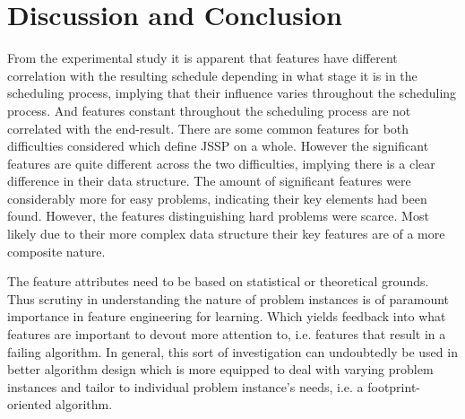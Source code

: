 \documentclass[10pt]{llncs} %
\newcommand{\bad}{\emph{bad} }
\begin{document}
\section{Discussion and Conclusion}\label{sec:Discussion}

From the experimental study it is apparent that features have different %
correlation with the resulting schedule depending in what stage it is in the scheduling process, implying that their influence varies throughout the scheduling process. And features constant throughout the scheduling process are not correlated with the end-result.
There are some common features for both difficulties considered which define JSSP on a whole. However the significant features are quite different across the two difficulties, implying there is a clear difference in their data structure. The amount of significant features were considerably more for easy problems, indicating their key elements had been found. However, the features distinguishing hard problems were scarce. Most likely due to their more complex data structure their key features are of a more composite nature.



The feature attributes need to be based on statistical or theoretical grounds. Thus scrutiny in understanding the nature of problem instances is of paramount importance in feature engineering for learning. Which yields feedback into what features are important to devout more attention to, i.e. features that result in a failing algorithm. %
In general, this sort of investigation can undoubtedly be used in better algorithm design which is more equipped to deal with varying problem instances and tailor to individual problem instance's needs, i.e. a footprint-oriented algorithm. 
\end{document}
